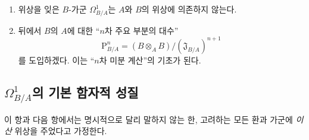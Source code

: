 \begin{remarks}[20.4.14]
\label{0.20.4.14-ko}
\begin{enumerate}
  \item[\rm(i)] 위상을 잊은 $B$-가군 $\Omega^1_{B/A}$는 $A$와
  $B$의 위상에 의존하지 않는다.
  \item[\rm(ii)] 뒤에서 $B$의 $A$에 대한 “$n$차 주요 부분의
  대수”
  \[
    \mathrm P^n_{B/A}
    =(B\otimes_A B)/(\mathfrak J_{B/A})^{n+1}
  \]
  를 도입하겠다. 이는 “$n$차 미분 계산”의 기초가 된다.
\end{enumerate}
\end{remarks}

\subsection{\texorpdfstring{$\Omega^1_{B/A}$}{Omega1(B/A)}의 기본
함자적 성질}
\label{subsection:0.20.5-ko}

\begin{env}[20.5.1]
\label{0.20.5.1-ko}
이 항과 다음 항에서는 명시적으로 달리 말하지 않는 한, 고려하는
모든 환과 가군에 \emph{이산} 위상을 주었다고 가정한다.
\end{env}


